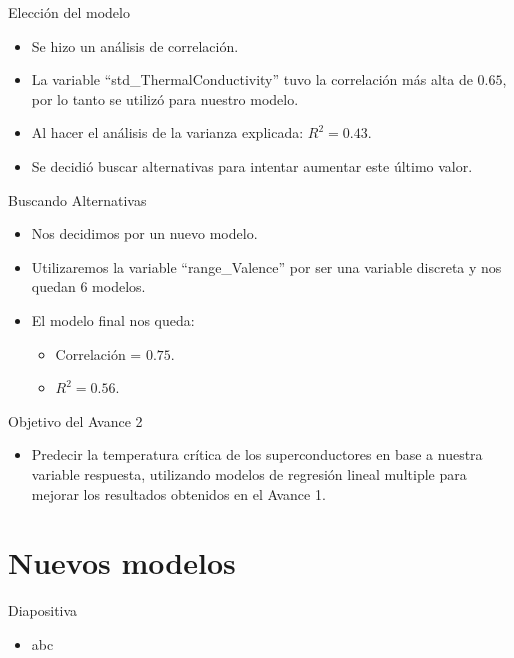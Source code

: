 \documentclass[11pt]{beamer}
\begin{document}
\begin{frame}{Elección del modelo}
	\begin{itemize}
		\item Se hizo un análisis de correlación.
		\pause
		\item La variable ``std\_ThermalConductivity'' tuvo la correlación más alta de $0.65$, por lo tanto se utilizó para nuestro modelo.
		\pause
		\item Al hacer el análisis de la varianza explicada: $R^2=0.43$.
		\pause
		\item Se decidió buscar alternativas para intentar aumentar este último valor.
	\end{itemize}
\end{frame}

\begin{frame}{Buscando Alternativas}
	\begin{itemize}
		\item  Nos decidimos por un nuevo modelo.
		\pause
		\item  Utilizaremos la variable ``range\_Valence'' por ser una variable discreta y nos quedan 6 modelos. 
		\pause
		\item  El modelo final nos queda:
		\begin{itemize}
			\pause
			\item  Correlación = $0.75$.
			\pause
			\item  $R^2 = 0.56$.
		\end{itemize}
	\end{itemize}
\end{frame}

\begin{frame}{Objetivo del Avance 2}
	\begin{itemize}
		\item Predecir la temperatura crítica de los superconductores en base a nuestra variable respuesta, utilizando modelos de regresión lineal multiple para mejorar los resultados obtenidos en el Avance 1.
	\end{itemize}
\end{frame}


\section{Nuevos modelos}

\begin{frame}{Diapositiva}
	\begin{itemize}
		\item abc
	\end{itemize}
\end{frame}
\end{document}
